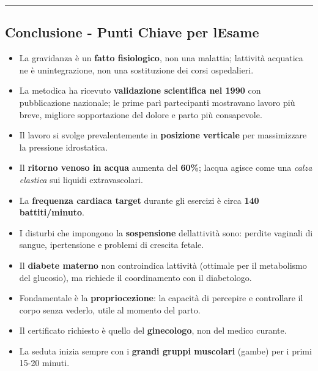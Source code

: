 \documentclass[a4paper,11pt]{article}
\providecommand{\tightlist}{%
  \setlength{\itemsep}{0pt}\setlength{\parskip}{0pt}}
\begin{document}
\begin{center}\rule{0.5\linewidth}{0.5pt}\end{center}

\subsection{Conclusione - Punti Chiave per
      l\textquotesingle Esame}\label{conclusione---punti-chiave-per-lesame-5}

\begin{itemize}
      \tightlist
      \item
            La gravidanza è un \textbf{fatto fisiologico}, non una malattia;
            l\textquotesingle attività acquatica ne è
            un\textquotesingle integrazione, non una sostituzione dei corsi
            ospedalieri.
      \item
            La metodica ha ricevuto \textbf{validazione scientifica nel 1990} con
            pubblicazione nazionale; le prime parì partecipanti mostravano lavoro
            più breve, migliore sopportazione del dolore e parto più consapevole.
      \item
            Il lavoro si svolge prevalentemente in \textbf{posizione verticale}
            per massimizzare la pressione idrostatica.
      \item
            Il \textbf{ritorno venoso in acqua} aumenta del \textbf{60\%};
            l\textquotesingle acqua agisce come una \emph{calza elastica} sui
            liquidi extravascolari.
      \item
            La \textbf{frequenza cardiaca target} durante gli esercizi è circa
            \textbf{140 battiti/minuto}.
      \item
            I disturbi che impongono la \textbf{sospensione}
            dell\textquotesingle attività sono: perdite vaginali di sangue,
            ipertensione e problemi di crescita fetale.
      \item
            Il \textbf{diabete materno} non controindica
            l\textquotesingle attività (ottimale per il metabolismo del glucosio),
            ma richiede il coordinamento con il diabetologo.
      \item
            Fondamentale è la \textbf{propriocezione}: la capacità di percepire e
            controllare il corpo senza vederlo, utile al momento del parto.
      \item
            Il certificato richiesto è quello del \textbf{ginecologo}, non del
            medico curante.
      \item
            La seduta inizia sempre con i \textbf{grandi gruppi muscolari} (gambe)
            per i primi 15-20 minuti.
\end{itemize}
\end{document}
